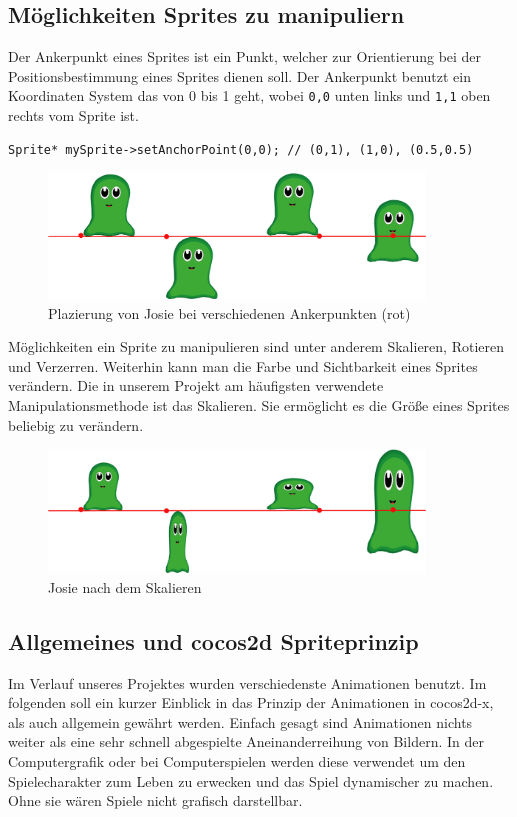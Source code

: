 \subsection{Möglichkeiten Sprites zu manipuliern}
Der Ankerpunkt eines Sprites ist ein Punkt, welcher zur Orientierung bei der Positionsbestimmung eines Sprites dienen soll. Der Ankerpunkt benutzt ein Koordinaten System das von 0 bis 1 geht, wobei \texttt{0,0} unten links und \texttt{1,1} oben rechts vom Sprite ist.

\begin{lstlisting}[style=singleline]
Sprite* mySprite->setAnchorPoint(0,0); // (0,1), (1,0), (0.5,0.5)
\end{lstlisting}

\begin{figure}[H]
  \centering
  \includegraphics[width=10cm]{resources/josiedoku3}
  \caption{Plazierung von Josie bei verschiedenen Ankerpunkten (rot)}
  \label{fig:josie_ancherpoint} 
\end{figure}

Möglichkeiten ein Sprite zu manipulieren sind unter anderem Skalieren, Rotieren und Verzerren. Weiterhin kann man die Farbe und Sichtbarkeit eines Sprites verändern. Die in unserem Projekt am häufigsten verwendete Manipulationsmethode ist das Skalieren. Sie ermöglicht es die Größe eines Sprites beliebig zu verändern.

\begin{figure}[H]
 \centering
  \includegraphics[width=10cm]{resources/josiedoku4}
  \caption{Josie nach dem Skalieren}
  \label{fig:josie_scale} 
\end{figure}



\label{sec:2_Animationsprinzip}

\subsection{Allgemeines und cocos2d Spriteprinzip}
Im Verlauf unseres Projektes wurden verschiedenste Animationen benutzt. Im folgenden soll ein kurzer Einblick in das Prinzip der Animationen in cocos2d-x, als auch allgemein gewährt werden. Einfach gesagt sind Animationen nichts weiter als eine sehr schnell abgespielte Aneinanderreihung von Bildern. In der Computergrafik oder bei Computerspielen werden diese verwendet um den Spielecharakter zum Leben zu erwecken und das Spiel dynamischer zu machen. Ohne sie wären Spiele nicht grafisch darstellbar.

